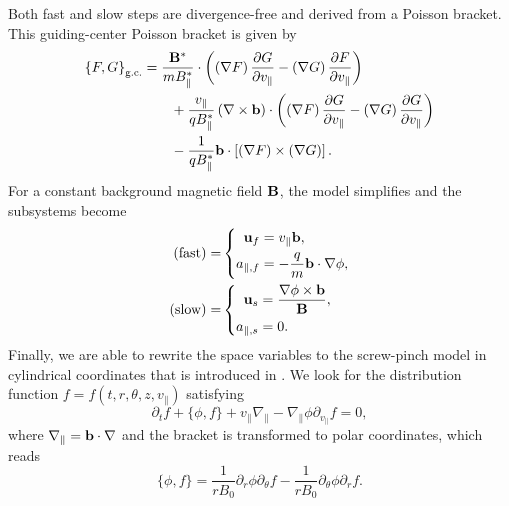 Both fast and slow steps are divergence-free and derived from a Poisson bracket.
This guiding-center Poisson bracket is given by
\begin{equation}
	\begin{aligned}
		\left\{ F, G \right\}_{\text{g.c.}} & = \frac{\mathbf{B}^\ast}{m B_\parallel^\ast} \cdot \left( \left(\nabla F\right) \frac{\partial G}{\partial v_\parallel} - \left(\nabla G\right) \frac{\partial F}{\partial v_\parallel} \right) \\
		& \qquad + \frac{v_\parallel}{q B_\parallel^\ast} \left( \nabla \times \mathbf{b} \right) \cdot \left( \left(\nabla F\right) \frac{\partial G}{\partial v_\parallel} - \left(\nabla G\right) \frac{\partial G}{\partial v_\parallel} \right) \label{gc_lg} \\
		& \qquad - \frac{1}{q B_\parallel^\ast} \mathbf{b} \cdot \left[\left(\nabla F\right) \times \left(\nabla G\right)\right]. 
	\end{aligned}
\end{equation}
For a constant background magnetic field $\mathbf{B}$, the model simplifies and the subsystems become
\begin{subequations}
	\begin{align}
		(\text{fast}) = & \left\{ \begin{aligned}
			\mathbf{u}_f & = {v_\parallel} \mathbf{b}, \\
			a_{\parallel, f} & = -\frac{q}{m} \mathbf{b} \cdot \nabla \phi,
		\end{aligned} \right. \label{split step fast const B}\\
		(\text{slow}) = &  \left\{ \begin{aligned}
			\mathbf{u}_s & = \frac{\nabla \phi\times \mathbf{b}}{\mathbf{B}},  \\
			a_{\parallel, s} & = 0.
		\end{aligned} \right. \label{split step slow const B}
	\end{align}
\end{subequations}
Finally, we are able to rewrite the space variables to the screw-pinch model in cylindrical coordinates that is introduced in \cite{Latu_2017}. We look for the distribution function $f = f(t, r, \theta, z, v_\parallel)$ satisfying
\begin{equation}
\partial_t f + \{\phi, f\} + v_\parallel \nabla_\parallel - \nabla_\parallel \phi \partial_{v_\parallel}f = 0, \label{eq:GK_model}
\end{equation}
where $\nabla_\parallel = \mathbf{b} \cdot \nabla$ and the bracket is transformed to polar coordinates, which reads
\begin{equation}
\{\phi, f \} = \frac{1}{rB_0}\partial_r \phi\partial_\theta f -\frac{1}{rB_0}\partial_\theta \phi\partial_r f. \label{eq:bracket_in_polar}
\end{equation}
